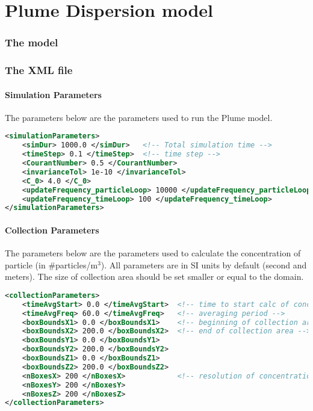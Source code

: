 \part{Plume Dispersion model}

\section{The model}

\newpage
\section{The XML file}

\subsection{Simulation Parameters}

The parameters below are the parameters used to run the Plume model.

\begin{lstlisting}[language=XML]
<simulationParameters>
    <simDur> 1000.0 </simDur>   <!-- Total simulation time -->
    <timeStep> 0.1 </timeStep>  <!-- time step -->
    <CourantNumber> 0.5 </CourantNumber>  
    <invarianceTol> 1e-10 </invarianceTol>
    <C_0> 4.0 </C_0>
    <updateFrequency_particleLoop> 10000 </updateFrequency_particleLoop>
    <updateFrequency_timeLoop> 100 </updateFrequency_timeLoop>
</simulationParameters>
\end{lstlisting}

\subsection{Collection Parameters}

The parameters below are the parameters used to calculate the concentration of particle (in \#particles/m$^{3}$). All parameters are in SI units by default (second and meters). The size of collection area should be set smaller or equal to the domain. 
\begin{lstlisting}[language=XML]
<collectionParameters>
    <timeAvgStart> 0.0 </timeAvgStart>  <!-- time to start calc of concentration -->
    <timeAvgFreq> 60.0 </timeAvgFreq>   <!-- averaging period -->
    <boxBoundsX1> 0.0 </boxBoundsX1>    <!-- beginning of collection area -->
    <boxBoundsX2> 200.0 </boxBoundsX2>  <!-- end of collection area -->
    <boxBoundsY1> 0.0 </boxBoundsY1>
    <boxBoundsY2> 200.0 </boxBoundsY2>
    <boxBoundsZ1> 0.0 </boxBoundsZ1>
    <boxBoundsZ2> 200.0 </boxBoundsZ2>
    <nBoxesX> 200 </nBoxesX>            <!-- resolution of concentration -->
    <nBoxesY> 200 </nBoxesY>
    <nBoxesZ> 200 </nBoxesZ>
</collectionParameters>
\end{lstlisting}

